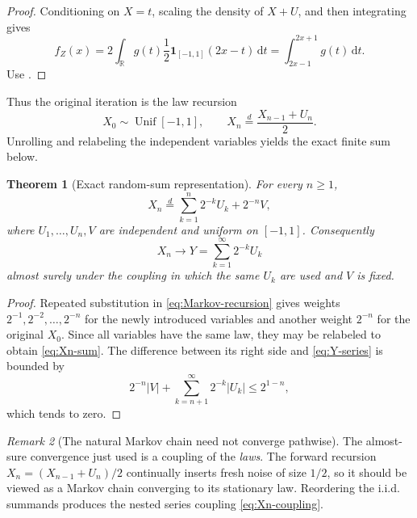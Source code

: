 \documentclass[11pt,oneside]{article}
\newtheorem{theorem}{Theorem}[section]
\theoremstyle{definition}
\theoremstyle{remark}
\newtheorem{remark}[theorem]{Remark}
\newcommand{\R}{\mathbb R}
\newcommand{\dd}{\,\mathrm d}
\newcommand{\Unif}{\operatorname{Unif}}
\begin{document}
\begin{proof}
Conditioning on $X=t$, scaling the density of $X+U$, and then integrating gives
\[
 f_Z(x)=2\int_{\R}g(t)\frac12\mathbf 1_{[-1,1]}(2x-t)\dd t
       =\int_{2x-1}^{2x+1}g(t)\dd t.
\]
Use .
\end{proof}

Thus the original iteration is the law recursion
\begin{equation}
 X_0\sim\Unif[-1,1],\qquad
 X_n\overset d=\frac{X_{n-1}+U_n}{2}.                      \label{eq:Markov-recursion}
\end{equation}
Unrolling and relabeling the independent variables yields the exact finite sum below.

\begin{theorem}[Exact random-sum representation]
\label{thm:random-sum}
For every $n\ge1$,
\begin{equation}
 X_n\overset d=\sum_{k=1}^{n}2^{-k}U_k+2^{-n}V,            \label{eq:Xn-sum}
\end{equation}
where $U_1,\ldots,U_n,V$ are independent and uniform on $[-1,1]$.
Consequently
\begin{equation}
 X_n\longrightarrow Y=\sum_{k=1}^{\infty}2^{-k}U_k        \label{eq:Xn-coupling}
\end{equation}
almost surely under the coupling in which the same $U_k$ are used and $V$ is fixed.
\end{theorem}

\begin{proof}
Repeated substitution in \eqref{eq:Markov-recursion} gives weights
$2^{-1},2^{-2},\ldots,2^{-n}$ for the newly introduced variables and another weight $2^{-n}$
for the original $X_0$.  Since all variables have the same law, they may be relabeled to obtain
\eqref{eq:Xn-sum}.  The difference between its right side and \eqref{eq:Y-series} is bounded by
\[
 2^{-n}|V|+\sum_{k=n+1}^{\infty}2^{-k}|U_k|\le2^{1-n},
\]
which tends to zero.
\end{proof}

\begin{remark}[The natural Markov chain need not converge pathwise]
The almost-sure convergence just used is a coupling of the \emph{laws}.  The forward recursion
$X_n=(X_{n-1}+U_n)/2$ continually inserts fresh noise of size $1/2$, so it should be viewed as
a Markov chain converging to its stationary law.  Reordering the i.i.d. summands produces the
nested series coupling \eqref{eq:Xn-coupling}.
\end{remark}
\end{document}
